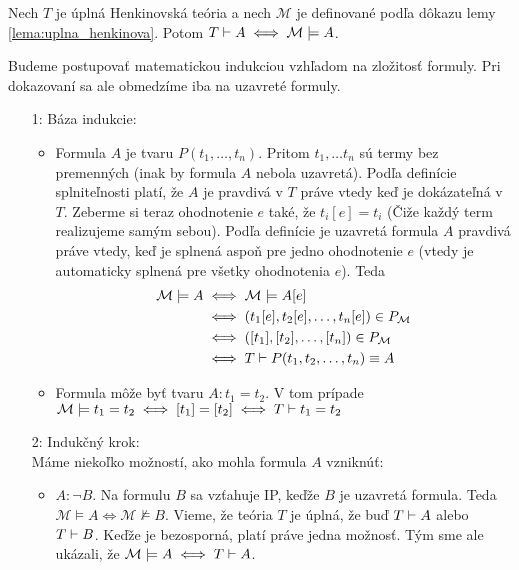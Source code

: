 \begin{veta}
    Nech $T$ je úplná Henkinovská teória a nech $\mathcal{M}$ je
    definované podľa dôkazu lemy \ref{lema:uplna_henkinova}.
    Potom $T \vdash A \iff \mathcal{M} \models A$.
\end{veta}

\begin{dokaz}
    Budeme postupovať matematickou indukciou vzhľadom na zložitosť
    formuly. Pri dokazovaní sa ale obmedzíme iba na uzavreté formuly.
    \begin{itemize}
    \item[1:] Báza indukcie:
        \begin{itemize}
        \item Formula $A$ je tvaru $P(t_1,\dots,t_n)$. Pritom $t_1,
            \dots t_n$ sú termy bez premenných (inak by formula $A$
            nebola uzavretá). Podľa definície splniteľnosti platí, že
            $A$ je pravdivá v $T$ práve vtedy keď je dokázateľná v
            $T$. Zeberme si teraz ohodnotenie $e$ také, že
            $t_i[e] = t_i$ (Čiže každý term realizujeme samým sebou).
            Podľa definície je uzavretá formula $A$ pravdivá práve vtedy, 
            keď je splnená aspoň pre jedno ohodnotenie $e$ (vtedy je
            automaticky splnená pre všetky ohodnotenia $e$).
            Teda
            \begin{equation*}
            \begin{split}
                \mathcal{M} \models A 
                &\iff \mathcal{M} \models A[e] \\
                &\iff (t_1[e],t_2[e],\dots,t_n[e]) \in P_\mathcal{M}
                \\
                &\iff ([t_1],[t_2],\dots,[t_n]) \in P_\mathcal{M} \\
                &\iff T \vdash P(t_1,t_2, \dots, t_n) \equiv A
            \end{split}
            \end{equation*}

        \item Formula môže byť tvaru $A:t_1=t_2$. V tom prípade
            $\mathcal{M} \models t_1 = t_2 \iff [t_1]=[t_2] \iff
                T \vdash t_1=t_2$
        \end{itemize}

    \item[2:] Indukčný krok:\\
        Máme niekoľko možností, ako mohla formula $A$ vzniknúť:
        \begin{itemize}
        \item $A:\neg B$. Na formulu $B$ sa vzťahuje IP, keďže $B$ je
            uzavretá formula. Teda
            $\mathcal{M} \models A \iff \mathcal{M} \not \models B$.
            Vieme, že teória $T$ je úplná, že buď $T \vdash A$
            alebo $T \vdash B$. Keďže je bezosporná, platí práve
            jedna možnosť. Tým sme ale ukázali, že
            $\mathcal{M} \models A \iff T \vdash A$.


\end{itemize}
\end{itemize}
\end{dokaz}
